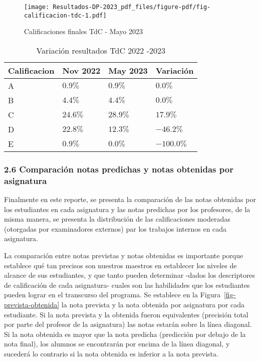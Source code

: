 \documentclass[
  letterpaper,
  DIV=11,
  numbers=noendperiod]{scrartcl}
\begin{document}
\begin{figure}

{\centering \texttt{[image: Resultados-DP-2023\_pdf\_files/figure-pdf/fig-calificacion-tdc-1.pdf]}

}

\caption{\label{fig-calificacion-tdc}Calificaciones finales TdC - Mayo
2023}

\end{figure}

\hypertarget{tbl-variacion-tdc}{}
\begin{longtable}{llll}
\caption{\label{tbl-variacion-tdc}Variación resultados TdC 2022 -2023 }\tabularnewline

\toprule
Calificacion & Nov 2022 & May 2023 & Variación \\ 
\midrule
A & $0.9\%$ & $0.9\%$ & $0.0\%$ \\ 
B & $4.4\%$ & $4.4\%$ & $0.0\%$ \\ 
C & $24.6\%$ & $28.9\%$ & $17.9\%$ \\ 
D & $22.8\%$ & $12.3\%$ & $-46.2\%$ \\ 
E & $0.9\%$ & $0.0\%$ & $-100.0\%$ \\ 
\bottomrule
\end{longtable}

\hypertarget{comparaciuxf3n-notas-predichas-y-notas-obtenidas-por-asignatura}{%
\subsubsection{2.6 Comparación notas predichas y notas obtenidas por
asignatura}\label{comparaciuxf3n-notas-predichas-y-notas-obtenidas-por-asignatura}}

Finalmente en este reporte, se presenta la comparación de las notas
obtenidas por los estudiantes en cada asignatura y las notas predichas
por los profesores, de la misma manera, se presenta la distribución de
las calificaciones moderadas (otorgadas por examinadores externos) par
los trabajos internos en cada asignatura.

La comparación entre notas previstas y notas obtenidas es importante
porque establece qué tan precisos son nuestros maestros en establecer
los niveles de alcance de sus estudiantes, y que tanto pueden determinar
-dados los descriptores de calificación de cada asignatura- cuales son
las habilidades que los estudiantes pueden lograr en el transcurso del
programa. Se establece en la Figura~\ref{fig-prevista-obtenida} la nota
prevista y la nota obtenida por asignatura por cada estudiante. Si la
nota prevista y la obtenida fueron equivalentes (precisión total por
parte del profesor de la asignatura) las notas estarán sobre la línea
diagonal. Si la nota obtenida es mayor que la nota predicha (predicción
por debajo de la nota final), los alumnos se encontrarán por encima de
la línea diagonal, y sucederá lo contrario si la nota obtenida es
inferior a la nota prevista.
\end{document}
